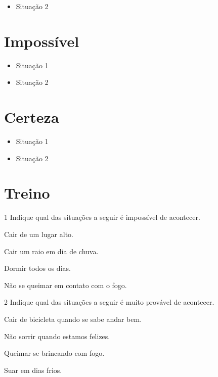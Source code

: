 \begin{itemize}
\item Situação 2
\end{itemize}

\section*{Impossível}

\begin{itemize}
\item Situação 1
\end{itemize}

\begin{itemize}
\item Situação 2
\end{itemize}

\section*{Certeza}

\begin{itemize}
\item Situação 1
\end{itemize}

\begin{itemize}
\item Situação 2
\end{itemize}

\section*{Treino}

\num{1} Indique qual das situações a seguir é impossível de acontecer.

\begin{escolha}[itemsep=-5pt]
\item Cair de um lugar alto.

\item Cair um raio em dia de chuva.

\item Dormir todos os dias.

\item Não se queimar em contato com o fogo.
\end{escolha}

\num{2} Indique qual das situações a seguir é muito provável de acontecer.

\begin{escolha}[itemsep=-5pt]
\item Cair de bicicleta quando se sabe andar bem.

\item Não sorrir quando estamos felizes.

\item Queimar-se brincando com fogo.

\item Suar em dias frios.
\end{escolha}


